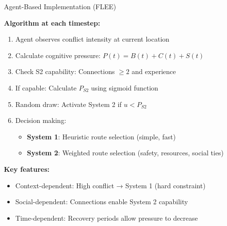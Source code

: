 \documentclass[aspectratio=169]{beamer}
\begin{document}
\begin{frame}{Agent-Based Implementation (FLEE)}

\textbf{Algorithm at each timestep:}

\begin{enumerate}
    \item Agent observes conflict intensity at current location
    \item Calculate cognitive pressure: $P(t) = B(t) + C(t) + S(t)$
    \item Check S2 capability: Connections $\geq 2$ and experience
    \item If capable: Calculate $P_{S2}$ using sigmoid function
    \item Random draw: Activate System 2 if $u < P_{S2}$
    \item Decision making:
    \begin{itemize}
        \item \textbf{System 1}: Heuristic route selection (simple, fast)
        \item \textbf{System 2}: Weighted route selection (safety, resources, social ties)
    \end{itemize}
\end{enumerate}

\vspace{0.5em}

\textbf{Key features:}
\begin{itemize}
    \item Context-dependent: High conflict → System 1 (hard constraint)
    \item Social-dependent: Connections enable System 2 capability
    \item Time-dependent: Recovery periods allow pressure to decrease
\end{itemize}

\end{frame}
\end{document}
